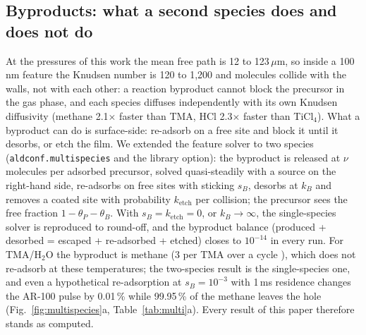 \documentclass[11pt,letterpaper]{article}
\begin{document}
\subsection{Byproducts: what a second species does and does not do}
\label{sec:byproducts}
At the pressures of this work the mean free path is 12 to 123\,$\mu$m, so inside a 100\,nm feature the Knudsen number is 120 to 1,200 and molecules collide with the walls, not with each other: a reaction byproduct cannot block the precursor in the gas phase, and each species diffuses independently with its own Knudsen diffusivity (methane 2.1$\times$ faster than TMA, HCl 2.3$\times$ faster than TiCl$_4$). What a byproduct can do is surface-side: re-adsorb on a free site and block it until it desorbs, or etch the film. We extended the feature solver to two species (\texttt{aldconf.multispecies} and the library option): the byproduct is released at $\nu$ molecules per adsorbed precursor, solved quasi-steadily with a source on the right-hand side, re-adsorbs on free sites with sticking $s_B$, desorbs at $k_B$ and removes a coated site with probability $k_{\mathrm{etch}}$ per collision; the precursor sees the free fraction $1 - \theta_P - \theta_B$. With $s_B = k_{\mathrm{etch}} = 0$, or $k_B \to \infty$, the single-species solver is reproduced to round-off, and the byproduct balance (produced + desorbed = escaped + re-adsorbed + etched) closes to $10^{-14}$ in every run. For TMA/H$_2$O the byproduct is methane (3 per TMA over a cycle \cite{puurunen2005}), which does not re-adsorb at these temperatures; the two-species result is the single-species one, and even a hypothetical re-adsorption at $s_B = 10^{-3}$ with 1\,ms residence changes the AR-100 pulse by 0.01\,\% while 99.95\,\% of the methane leaves the hole (Fig.~\ref{fig:multispecies}a, Table~\ref{tab:multi}a). Every result of this paper therefore stands as computed.
\end{document}
